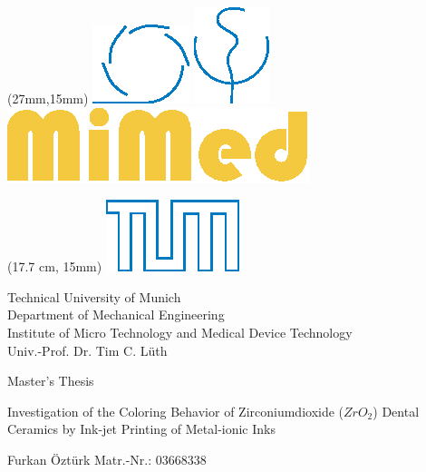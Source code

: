 \thispagestyle{plain}


\begin{textblock*}{9 cm}(27mm,15mm)
\includegraphics[valign=t]{grafiken/MW_CMYK.eps}
\hspace{5 mm}
\includegraphics[valign=t]{grafiken/MED_CMYK.eps}
\hspace{5 mm}
\includegraphics[valign=t]{grafiken/MiMed.eps}
\end{textblock*}

\begin{textblock*}{2 cm}(17.7 cm, 15mm)
\includegraphics[]{grafiken/TUMLogo_oZ_Outline_blau_CMYK.eps}
\end{textblock*}

\hspace{5 mm}

\begin{center}
\begin{singlespace}
\small Technical University of Munich\smallskip\\
Department of Mechanical Engineering\smallskip\\
Institute of Micro Technology and Medical Device Technology\smallskip\\
Univ.-Prof. Dr. Tim C. Lüth
\end{singlespace}
\end{center}
\vspace{0.8 cm}
\begin{center}
{\large Master's Thesis}
\end{center}
\vspace{0.70 cm}
\begin{center}
{\Large Investigation of the Coloring Behavior of Zirconiumdioxide ($ZrO_2$) Dental Ceramics by Ink-jet Printing of Metal-ionic Inks}
\end{center}
\vspace{0.70 cm}
\begin{center}
{\large Furkan Öztürk\nl
Matr.-Nr.: 03668338}
\end{center}

